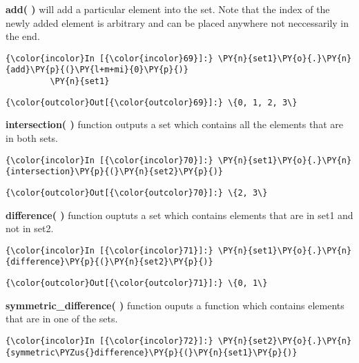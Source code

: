     \textbf{add( )} will add a particular element into the set. Note that
the index of the newly added element is arbitrary and can be placed
anywhere not neccessarily in the end.

    \begin{Verbatim}[commandchars=\\\{\}]
{\color{incolor}In [{\color{incolor}69}]:} \PY{n}{set1}\PY{o}{.}\PY{n}{add}\PY{p}{(}\PY{l+m+mi}{0}\PY{p}{)}
         \PY{n}{set1}
\end{Verbatim}

            \begin{Verbatim}[commandchars=\\\{\}]
{\color{outcolor}Out[{\color{outcolor}69}]:} \{0, 1, 2, 3\}
\end{Verbatim}
        
    \textbf{intersection( )} function outputs a set which contains all the
elements that are in both sets.

    \begin{Verbatim}[commandchars=\\\{\}]
{\color{incolor}In [{\color{incolor}70}]:} \PY{n}{set1}\PY{o}{.}\PY{n}{intersection}\PY{p}{(}\PY{n}{set2}\PY{p}{)}
\end{Verbatim}

            \begin{Verbatim}[commandchars=\\\{\}]
{\color{outcolor}Out[{\color{outcolor}70}]:} \{2, 3\}
\end{Verbatim}
        
    \textbf{difference( )} function ouptuts a set which contains elements
that are in set1 and not in set2.

    \begin{Verbatim}[commandchars=\\\{\}]
{\color{incolor}In [{\color{incolor}71}]:} \PY{n}{set1}\PY{o}{.}\PY{n}{difference}\PY{p}{(}\PY{n}{set2}\PY{p}{)}
\end{Verbatim}

            \begin{Verbatim}[commandchars=\\\{\}]
{\color{outcolor}Out[{\color{outcolor}71}]:} \{0, 1\}
\end{Verbatim}
        
    \textbf{symmetric\_difference( )} function ouputs a function which
contains elements that are in one of the sets.

    \begin{Verbatim}[commandchars=\\\{\}]
{\color{incolor}In [{\color{incolor}72}]:} \PY{n}{set2}\PY{o}{.}\PY{n}{symmetric\PYZus{}difference}\PY{p}{(}\PY{n}{set1}\PY{p}{)}
\end{Verbatim}

